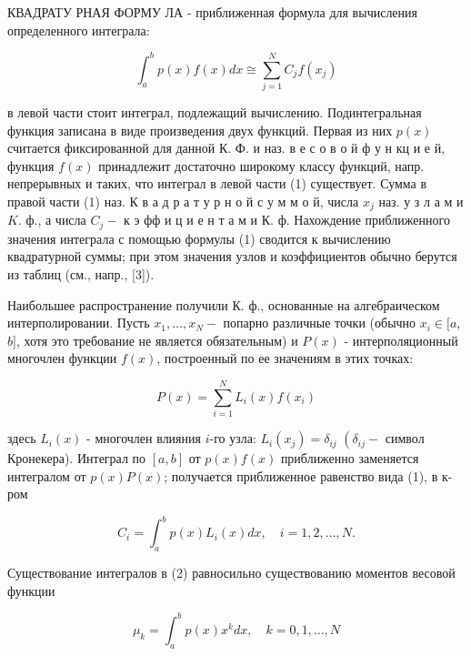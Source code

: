 \documentclass[10pt]{article}
\begin{document}
КВАДРАТУ РНАЯ ФОРМУ ЛА - приближенная формула для вычисления определенного интеграла:



\[

\int_{a}^{b} p(x) f(x) d x \cong \sum_{j=1}^{N} C_{j} f\left(x_{j}\right)

\]



в левой части стоит интеграл, подлежащий вычислению. Подинтегральная функция записана в виде произведения двух функций. Первая из них $p(x)$ считается фиксированной для данной К. Ф. и наз. в е с о в о й ф у н кц и е й, функция $f(x)$ принадлежит достаточно широкому классу функций, напр. непрерывных и таких, что интеграл в левой части (1) существует. Сумма в правой части (1) наз. К в а д р а т у р н о й с у м м о й, числа $x_{j}$ наз. у з л а м и $K$. ф., а числа $C_{j}-$ к э фф и ц и е н т а м и К. ф. Нахождение приближенного значения интеграла с помощью формулы (1) сводится к вычислению квадратурной суммы; при этом значения узлов и коэффициентов обычно берутся из таблиц (см., напр., [3]).



Наибольшее распространение получили К. ф., основанные на алгебраическом интерполировании. Пусть $x_{1}, \ldots, x_{N}-$ попарно различные точки (обычно $x_{i} \in[a$, $b]$, хотя это требование не является обязательным) и $P(x)$ - интерполяционный многочлен функции $f(x)$, построенный по ее значениям в этих точках:



\[

P(x)=\sum_{i=1}^{N} L_{i}(x) f\left(x_{i}\right)

\]



здесь $L_{i}(x)$ - многочлен влияния $i$-го узла: $L_{i}\left(x_{j}\right)=\delta_{i j}$ $\left(\delta_{i j}-\right.$ символ Кронекера). Интеграл по $[a, b]$ от $p(x) f(x)$ приближенно заменяется интегралом от $p(x) P(x)$; получается приближенное равенство вида (1), в к-ром



\[

C_{i}=\int_{a}^{b} p(x) L_{i}(x) d x, \quad i=1,2, \ldots, N .

\]



Существование интегралов в (2) равносильно существованию моментов весовой функции



\[

\mu_{k}=\int_{a}^{b} p(x) x^{k} d x, \quad k=0,1, \ldots, N

\]
\end{document}
